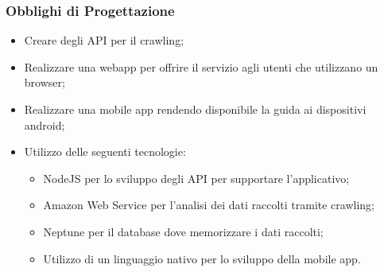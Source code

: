 \documentclass[letterpaper]{article}
\begin{document}
\subsubsection{Obblighi di Progettazione}
\begin{itemize}
  \item Creare degli API per il crawling;
  \item Realizzare una webapp per offrire il servizio agli utenti che utilizzano un browser;
  \item Realizzare una mobile app rendendo disponibile la guida ai dispositivi android;
  \item Utilizzo delle seguenti tecnologie: \begin{itemize}
    \item NodeJS per lo sviluppo degli API per supportare l’applicativo;
    \item Amazon Web Service per l'analisi dei dati raccolti tramite crawling;
    \item Neptune per il database dove memorizzare i dati raccolti;
    \item Utilizzo di un linguaggio nativo per lo sviluppo della mobile app.
  \end{itemize}

\end{itemize}
\end{document}
